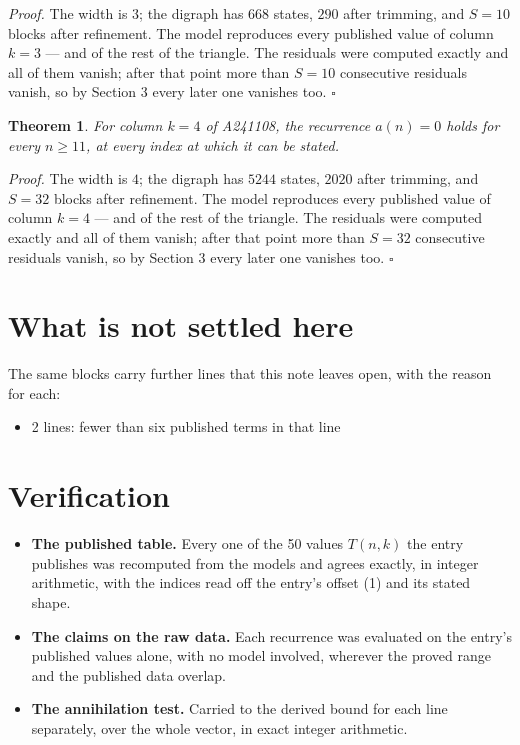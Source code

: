 \documentclass[11pt]{article}
\newtheorem{theorem}{Theorem}
\theoremstyle{definition}
\begin{document}
{\itshape Proof.} The width is $3$; the digraph has $668$ states, $290$ after trimming, and $S = 10$ blocks after refinement. The model reproduces every published value of column $k = 3$ --- and of the rest of the triangle. The residuals were computed exactly and all of them vanish; after that point more than $S = 10$ consecutive residuals vanish, so by Section 3 every later one vanishes too. $\square$

\begin{theorem} For column $k = 4$ of A241108, the recurrence $a(n) = 0$ holds for every $n \ge 11$, at every index at which it can be stated.\end{theorem}

{\itshape Proof.} The width is $4$; the digraph has $5244$ states, $2020$ after trimming, and $S = 32$ blocks after refinement. The model reproduces every published value of column $k = 4$ --- and of the rest of the triangle. The residuals were computed exactly and all of them vanish; after that point more than $S = 32$ consecutive residuals vanish, so by Section 3 every later one vanishes too. $\square$

\section{What is not settled here}

The same blocks carry further lines that this note leaves open, with the reason for each:

\begin{itemize}

\item 2 lines: fewer than six published terms in that line

\end{itemize}

\section{Verification}

\begin{itemize}

\item {\bfseries The published table.} Every one of the 50 values $T(n,k)$ the entry publishes was recomputed from the models and agrees exactly, in integer arithmetic, with the indices read off the entry's offset (1) and its stated shape.

\item {\bfseries The claims on the raw data.} Each recurrence was evaluated on the entry's published values alone, with no model involved, wherever the proved range and the published data overlap.

\item {\bfseries The annihilation test.} Carried to the derived bound for each line separately, over the whole vector, in exact integer arithmetic.

\end{itemize}
\end{document}
